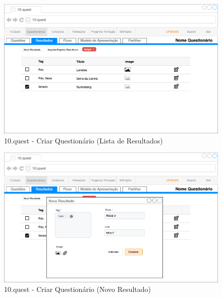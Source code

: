 \begin{figure}[ht!]
	\begin{center}
		\includegraphics[width=1\textwidth]{img/prototipos/15.png}
		\caption{10.quest - Criar Questionário (Lista de Resultados)}
		\label{10q-}
	\end{center}
\end{figure}

\begin{figure}[ht!]
	\begin{center}
		\includegraphics[width=1\textwidth]{img/prototipos/16.png}
		\caption{10.quest - Criar Questionário (Novo Resultado)}
		\label{10q-}
	\end{center}
\end{figure}


